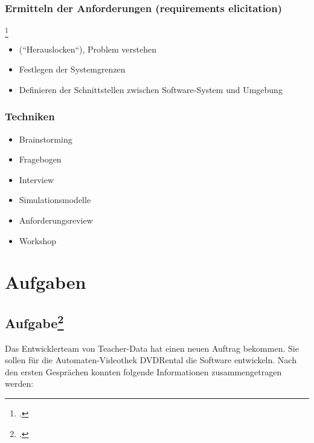 \documentclass{lehramt-informatik}
\begin{document}
%

\subsection{Ermitteln der Anforderungen (requirements elicitation)}\footcite[Seite
15]{sosy:fs:1}

\begin{itemize}
\item (“Herauslocken“), Problem verstehen
\item Festlegen der Systemgrenzen
\item Definieren der Schnittstellen zwischen Software-System und Umgebung
\end{itemize}

\subsection{Techniken}

\begin{itemize}
\item Brainstorming
\item Fragebogen
\item Interview
\item Simulationsmodelle
\item Anforderungsreview
\item Workshop
\end{itemize}


\chapter{Aufgaben}

\section{Aufgabe\footcite{sosy:ab:2}}

Das Entwicklerteam von Teacher-Data hat einen neuen Auftrag bekommen.
Sie sollen für die Automaten-Videothek DVDRental die Software
entwickeln. Nach den ersten Gesprächen konnten folgende Informationen
zusammengetragen werden:
\end{document}

